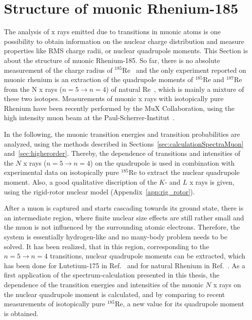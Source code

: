 \section{Structure of muonic Rhenium-185}
\label{sec:muon_re}
The analysis of x rays emitted due to transitions in muonic atoms is one possibility to obtain information on the nuclear charge distribution and measure properties like RMS charge radii, or nuclear quadrupole moments. This Section is about the structure of muonic Rhenium-185. So far, there is no absolute measurement of the charge radius of $^{185}$Re~\cite{schopper2004} and the only experiment reported on muonic rhenium is an extraction of the quadrupole moments of $^{185}$Re and $^{187}$Re from the N x rays (${n}{=}{5}\rightarrow{n}{=}{4}$) of natural Re~\cite{konijn1979}, which is mainly a mixture of these two isotopes. Measurements of muonic x rays with isotopically pure Rhenium have been recently performed by the MuX Collaboration, using the high intensity muon beam at the Paul-Scherrer-Institut~\cite{psiExperiments,psiFacilities}.

In the following, the muonic transition energies and transition probabilities are analyzed, using the methods described in Sections~\ref{sec:calculationSpectraMuon} and~\ref{sec:higherorder}. Thereby, the dependence of transitions and intensities of the $N$ x rays ($n=5\rightarrow n=4$) on the quadrupole is used in combination with experimental data on isotopically pure $^{185}$Re to extract the nuclear quadrupole moment. Also, a good qualitative discription of the $K$- and $L$ x rays is given, using the rigid-rotor nuclear model (Appendix~\ref{app:rig_rotor}).


After a muon is captured and starts cascading towards its ground state, there is an intermediate region, where finite nuclear size effects are still rather small and the muon is not influenced by the surrounding atomic electrons. Therefore, the system is essentially hydrogen-like and no many-body problem needs to be solved. It has been realized, that in this region, corresponding to the ${n}{=}{5}\rightarrow{n}{=}{4}$ transitions, nuclear quadrupole moments can be extracted, which has been done for Lutetium-175 in Ref.~\cite{Dey1979} and for natural Rhenium in Ref.~\cite{konijn1979}.
As a first application of the spectrum-calculation presented in this thesis, the dependence of the transition energies and intensities of the muonic $N$ x rays on the nuclear quadrupole moment is calculated, and by comparing to recent measurements of isotopically pure $^{185}$Re, a new value for its quadrupole moment is obtained.

